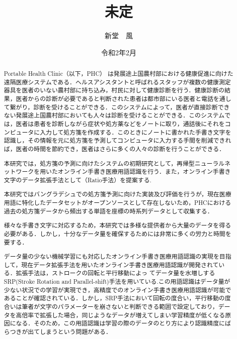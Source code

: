 \documentclass[a4paper,12pt]{jreport}
\title{未定}
\author{新堂　風}
\date{令和2年2月}
\begin{document}
\maketitle
\thispagestyle{empty}

\begin{abstract}
 Portable Health Clinic（以下，PHC） は発展途上国農村部における健康促進に向けた遠隔医療システムである．ヘルスアシスタントと呼ばれるスタッフが複数の健康測定器具を医者のいない農村部に持ち込み，村民に対して健康診断を行う．健康診断の結果，医者からの診断が必要であると判断された患者は都市部にいる医者と電話を通して繋がり，診断を受けることができる．このシステムによって，医者が直接診断できない発展途上国農村部においても人々は診断を受けることができる．このシステムでは，医者は患者を診断しながら症状や処方薬などをノートに取り，通話後にそれをコンピュータに入力して処方箋を作成する．このときにノートに書かれた手書き文字を認識し，その情報を元に処方箋を予測してコンピュータに入力する手間を削減できれば，医者の時間を節約でき，医者はさらに多くの人々の診断を行うことができる．

本研究では，処方箋の予測に向けたシステムの初期研究として，再帰型ニューラルネットワークを用いたオンライン手書き医療用語認識を行う．また，オンライン手書き文字のデータ拡張手法として（Ratio手法）を提案する.

本研究ではバングラデシュでの処方箋予測に向けた実装及び評価を行うが，現在医療用語に特化したデータセットがオープンソースとして存在しないため，PHCにおける過去の処方箋データから頻出する単語を座標の時系列データとして収集する．

様々な手書き文字に対応するため，本研究では多様な提供者から大量のデータを得る必要がある．しかし，十分なデータ量を確保するためには非常に多くの労力と時間を要する．

データ量の少ない機械学習にも対応したオンライン手書き医療用語認識の実現を目指して，現在データ拡張手法を用いたオンライン手書き医療用語認識が開発されている．拡張手法は，ストロークの回転と平行移動によっ てデータ量を水増しする SRP(Stroke Rotation and Parallel-shift)手法を用いている.この用語認識はデータ量が少ない状況での学習が実現でき，高精度でのオンライン手書き医療用語認識が可能であることが確認されている．しかし，SRP手法において回転の度合い，平行移動の度合いは筆者が文字のパラメーターを崩さないと判断できる範囲で設定しており，データを高倍率で拡張した場合，同じようなデータが増えてしまい学習精度が低くなる原因になる．そのため，この用語認識は学習の際のデータのとり方により認識精度にばらつきが出てしまうという問題がある．


\end{abstract}
\end{document}
